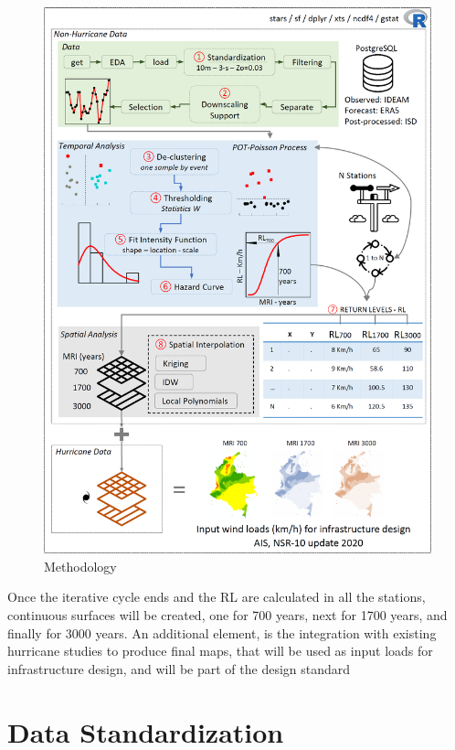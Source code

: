 \documentclass[12pt,oneside]{reedthesis}
\begin{document}
\begin{figure}

{\centering \includegraphics[width=6.26in]{figure/methodology} 

}

\caption{Methodology}\label{fig:methodology}
\end{figure}
Once the iterative cycle ends and the RL are calculated in all the stations, continuous surfaces will be created, one for 700 years, next for 1700 years, and finally for 3000 years. An additional element, is the integration with existing hurricane studies to produce final maps, that will be used as input loads for infrastructure design, and will be part of the design standard

\hypertarget{rmd-standardization}{%
\section{Data Standardization}\label{rmd-standardization}}
\end{document}
